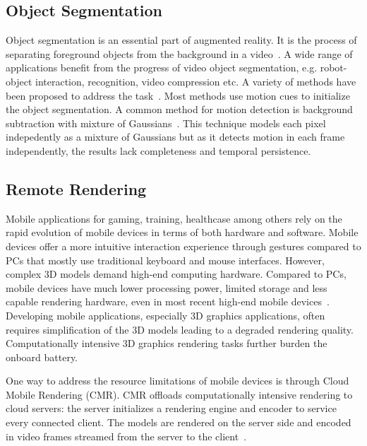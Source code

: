 \subsection{Object Segmentation}

Object segmentation is an essential part of augmented reality.
It is the process of separating foreground objects from the background in a video~\cite{papazoglou2013}. A wide range of applications benefit from the progress of video object segmentation, e.g. robot-object interaction, recognition, video compression etc.
%
A variety of methods have been proposed to address the task~\cite{papazoglou2013,ma2012,wang2015,brox2010,taylor2015}. Most methods use motion cues to initialize the object segmentation.
A common method for motion detection is  background subtraction with mixture of Gaussians~\cite{kaewtrakulpong2002,zivkovic2004}. This technique models each pixel indepedently as a mixture of Gaussians 
but as it detects motion in each frame independently, the results lack completeness and temporal persistence.

\subsection{Remote Rendering}

Mobile applications for gaming, training, healthcase among others rely on the rapid evolution of mobile devices in terms of both hardware and software.
Mobile devices offer a more intuitive interaction experience through gestures 
compared to PCs that mostly use traditional keyboard and mouse interfaces.
However, complex 3D models demand high-end computing hardware. Compared to PCs, mobile devices have much lower processing power, limited storage and less capable rendering hardware, even in most recent high-end mobile devices~\cite{feeney2001,ebert2002,shi2003,simunic2000}. Developing mobile applications, especially 3D graphics applications, often requires simplification of the 3D models leading to a degraded rendering quality.
Computationally intensive 3D graphics rendering tasks further burden the onboard battery.

One way to address the resource limitations of mobile devices is through Cloud Mobile Rendering (CMR).
CMR offloads computationally intensive rendering to cloud servers:
the server initializes a rendering engine and encoder to service every connected client. The models are rendered on the server side and encoded in video frames streamed from the server to the client~\cite{lamberti2007,lu2011,ma2017,chang2004,simoens2012}.

